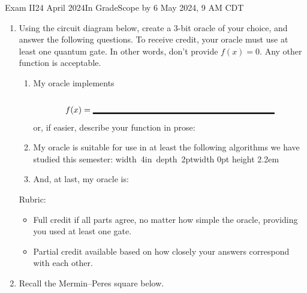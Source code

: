 \documentclass[12pt]{article}
\newcommand{\Blank}[1][1in]{\mbox{\vrule width #1 depth 2pt}\vrule width 0pt height 2.2em}
\begin{document}
\begin{assignment}{Exam II}{24 April 2024}{In GradeScope by 6 May 2024, 9 AM CDT}
\begin{enumerate}
\clearpage\item{}
Using the circuit diagram below, create a 3-bit oracle of your choice, and answer the following questions.  To receive credit, your oracle must use at least one quantum gate.  In other words, don't provide $f(x)=0$. Any other function is acceptable.

\begin{enumerate}
    \item My oracle implements \[f(x)=\Blank[3in]{}\]
    or, if easier, describe your function in prose:
    \LeaveSpace{1.5in}
    \item My oracle is suitable for use in at least the following algorithms we have studied this semester: \Blank[4in]{}
    \item And, at last, my oracle is:
    
    \bigskip
    \begin{center}
\end{center}
\end{enumerate}
Rubric:
\begin{itemize}
    \item Full credit if all parts agree, no matter how simple the oracle, providing you used at least one gate.
    \item Partial credit available based on how closely your answers correspond with each other.
\end{itemize}

\clearpage\item{} Recall the Mermin--Peres square below.


\end{enumerate}
\end{assignment}
\end{document}
